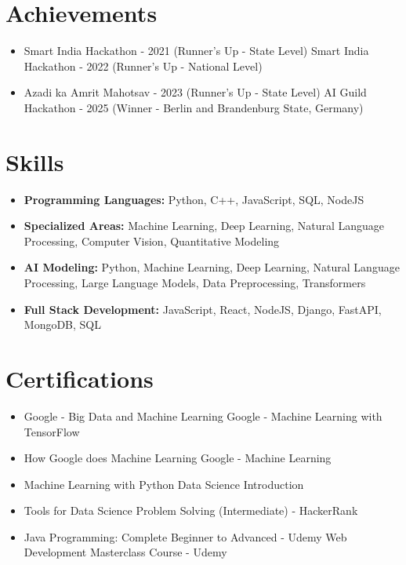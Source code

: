 \documentclass[a4paper,10pt]{article}
\begin{document}
\section*{Achievements}
\begin{itemize}
\item Smart India Hackathon - 2021 (Runner's Up - State Level) \hfill Smart India Hackathon - 2022 (Runner's Up - National Level)
\item Azadi ka Amrit Mahotsav - 2023 (Runner's Up - State Level) \hfill AI Guild Hackathon - 2025 (Winner - Berlin and Brandenburg State, Germany)
\end{itemize}

\section*{Skills}
\begin{itemize}
  \item \textbf{Programming Languages:} Python, C++, JavaScript, SQL, NodeJS
  \item \textbf{Specialized Areas:} Machine Learning, Deep Learning, Natural Language Processing, Computer Vision, Quantitative Modeling
  \item \textbf{AI Modeling:} Python, Machine Learning, Deep Learning, Natural Language Processing, Large Language Models, Data Preprocessing, Transformers
  \item \textbf{Full Stack Development:} JavaScript, React, NodeJS, Django, FastAPI, MongoDB, SQL
\end{itemize}

\section*{Certifications}
\begin{itemize}
\item Google - Big Data and Machine Learning \hfill Google - Machine Learning with TensorFlow
\item How Google does Machine Learning \hfill Google - Machine Learning
\item Machine Learning with Python \hfill Data Science Introduction
\item Tools for Data Science \hfill Problem Solving (Intermediate) - HackerRank
\item Java Programming: Complete Beginner to Advanced - Udemy \hfill Web Development Masterclass Course - Udemy
\end{itemize}
\end{document}
